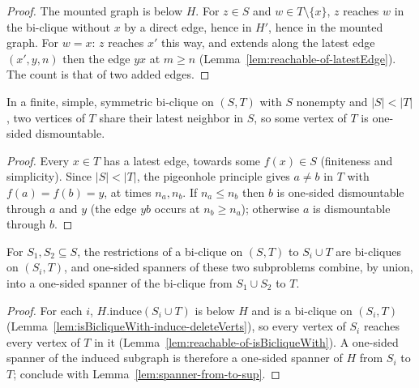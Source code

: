 \begin{proof}
  \leanok
  The mounted graph is below $H$. For $z \in S$ and $w \in T \setminus \{x\}$, $z$ reaches $w$ in the bi-clique without $x$ by a direct edge, hence in $H'$, hence in the mounted graph. For $w = x$: $z$ reaches $x'$ this way, and extends along the latest edge $(x', y, n)$ then the edge $yx$ at $m \ge n$ (Lemma~\ref{lem:reachable-of-latestEdge}). The count is that of two added edges.
\end{proof}

\begin{lemma}[Pigeonhole]
  \label{lem:exists-one-sided-dismountable}
  \leanok
  In a finite, simple, symmetric bi-clique on $(S, T)$ with $S$ nonempty and
  $|S| < |T|$, two vertices of $T$ share their latest neighbor in $S$, so
  some vertex of $T$ is one-sided dismountable.
\end{lemma}

\begin{proof}
  \leanok
  Every $x \in T$ has a latest edge, towards some $f(x) \in S$ (finiteness and simplicity). Since $|S| < |T|$, the pigeonhole principle gives $a \neq b$ in $T$ with $f(a) = f(b) = y$, at times $n_a, n_b$. If $n_a \le n_b$ then $b$ is one-sided dismountable through $a$ and $y$ (the edge $yb$ occurs at $n_b \ge n_a$); otherwise $a$ is dismountable through $b$.
\end{proof}

\begin{lemma}
  \label{lem:spanner-from-to-split}
  \leanok
  For $S_1, S_2 \subseteq S$, the restrictions of a bi-clique on $(S, T)$ to
  $S_i \cup T$ are bi-cliques on $(S_i, T)$, and one-sided spanners of these
  two subproblems combine, by union, into a one-sided spanner of the
  bi-clique from $S_1 \cup S_2$ to $T$.
\end{lemma}

\begin{proof}
  \leanok
  For each $i$, $H.\mathrm{induce}(S_i \cup T)$ is below $H$ and is a bi-clique on $(S_i, T)$ (Lemma~\ref{lem:isBicliqueWith-induce-deleteVerts}), so every vertex of $S_i$ reaches every vertex of $T$ in it (Lemma~\ref{lem:reachable-of-isBicliqueWith}). A one-sided spanner of the induced subgraph is therefore a one-sided spanner of $H$ from $S_i$ to $T$; conclude with Lemma~\ref{lem:spanner-from-to-sup}.
\end{proof}

